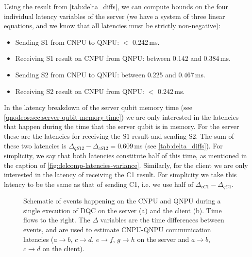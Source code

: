 Using the result from \cref{tab:delta_diffs}, we can compute bounds on the four individual latency variables of the server (we have a system of three linear equations, and we know that all latencies must be strictly non-negative):
%
\begin{itemize}
    \item Sending S1 from \ac{CNPU} to \ac{QNPU}: $<$ 0.242\,ms.
    \item Receiving S1 result on \ac{CNPU} from \ac{QNPU}: between 0.142 and 0.384\,ms.
    \item Sending S2 from \ac{CNPU} to \ac{QNPU}: between 0.225 and 0.467\,ms.
    \item Receiving S2 result on \ac{CNPU} from QNPU: $<$ 0.242\,ms.
\end{itemize}

In the latency breakdown of the server qubit memory time (see \cref{qnodeos:sec:server-qubit-memory-time}) we are only interested in the latencies that happen during the time that the server qubit is in memory. For the server these are the latencies for receiving the S1 result and sending S2. The sum of these two latencies is $\Delta_{qS12} - \Delta_{cS12} = 0.609$\,ms (see \cref{tab:delta_diffs}). For simplicity, we say that both latencies constitute half of this time, as mentioned in the caption of \cref{fig:delcomp-latencies-variance}. Similarly, for the client we are only interested in the latency of receiving the C1 result. For simplicity we take this latency to be the same as that of sending C1, i.e. we use half of $\Delta_{cC1} - \Delta_{qC1}$.

\begin{figure}[htbp]
    \centering
    \hfill
    \caption{Schematic of events happening on the \ac{CNPU} and \ac{QNPU} during a single execution of \ac{DQC} on the server (a) and the client (b). Time flows to the right. The $\Delta$ variables are the time differences between events, and are used to estimate \ac{CNPU}-\ac{QNPU} communication latencies ($a\rightarrow b$, $c\rightarrow d$, $e\rightarrow f$, $g\rightarrow h$ on the server and $a\rightarrow b$, $c\rightarrow d$ on the client).}
    \label{fig:cnpu_qnpu_latencies}%
\end{figure}

